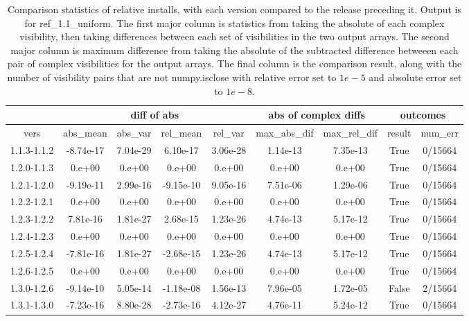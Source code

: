\documentclass[]{article}
\begin{document}
\begin{table}
\centering
\small
\begin{tabular}{| c | c c c c | c c | c c |} \hline
&\multicolumn{4}{|c|}{diff of abs}& \multicolumn{2}{|c|}{abs of complex diffs} & \multicolumn{2}{|c|}{outcomes}\\ \hline
vers & abs\_mean & abs\_var & rel\_mean & rel\_var & max\_abs\_dif & max\_rel\_dif & result & num\_err \\ \hline
1.1.3-1.1.2 & -8.74e-17 & 7.04e-29 & 6.10e-17 & 3.06e-28 & 1.14e-13 & 7.35e-13 & True & 0/15664 \\ \hline            1.2.0-1.1.3 & 0.e+00 & 0.e+00 & 0.e+00 & 0.e+00 & 0.e+00 & 0.e+00 & True & 0/15664 \\ \hline
1.2.1-1.2.0 & -9.19e-11 & 2.99e-16 & -9.15e-10 & 9.05e-16 & 7.51e-06 & 1.29e-06 & True & 0/15664 \\ \hline
1.2.2-1.2.1 & 0.e+00 & 0.e+00 & 0.e+00 & 0.e+00 & 0.e+00 & 0.e+00 & True & 0/15664 \\ \hline
1.2.3-1.2.2 & 7.81e-16 & 1.81e-27 & 2.68e-15 & 1.23e-26 & 4.74e-13 & 5.17e-12 & True & 0/15664 \\ \hline
1.2.4-1.2.3 & 0.e+00 & 0.e+00 & 0.e+00 & 0.e+00 & 0.e+00 & 0.e+00 & True & 0/15664 \\ \hline
1.2.5-1.2.4 & -7.81e-16 & 1.81e-27 & -2.68e-15 & 1.23e-26 & 4.74e-13 & 5.17e-12 & True & 0/15664 \\ \hline
1.2.6-1.2.5 & 0.e+00 & 0.e+00 & 0.e+00 & 0.e+00 & 0.e+00 & 0.e+00 & True & 0/15664 \\ \hline
1.3.0-1.2.6 & -9.14e-10 & 5.05e-14 & -1.18e-08 & 1.56e-13 & 7.96e-05 & 1.72e-05 & False & 2/15664 \\ \hline
1.3.1-1.3.0 & -7.23e-16 & 8.80e-28 & -2.73e-16 & 4.12e-27 & 4.76e-11 & 5.24e-12 & True & 0/15664 \\ \hline
\end{tabular}
\caption{Comparison statistics of relative installs, with each version compared to the release preceding it. Output is for ref\_1.1\_uniform. The first major column is statistics from taking the absolute of each complex visibility, then taking differences between each set of visibilities in the two output arrays. The second major column is maximum difference from taking the absolute of the subtracted difference betweeen each pair of complex visibilities for the output arrays. The final column is the comparison result, along with the number of visibility pairs that are not numpy.isclose with relative error set to $1e{-}5$ and absolute error set to $1e{-}8$.}

\end{table}
\end{document}
